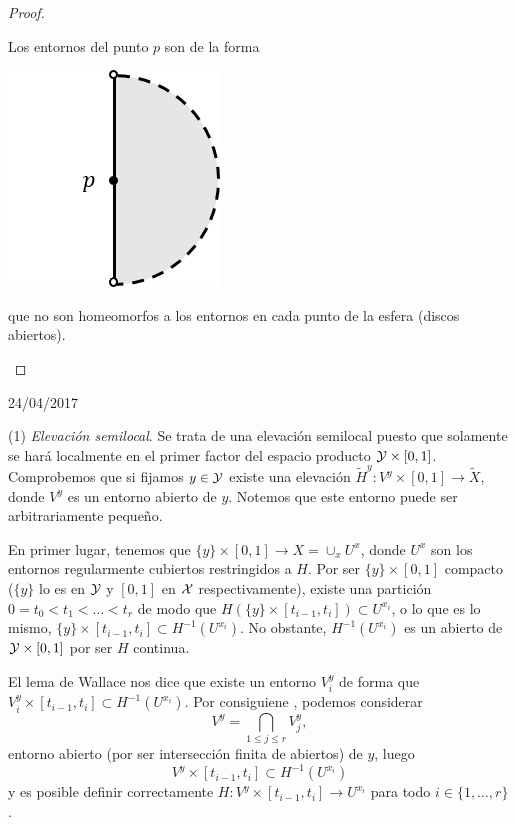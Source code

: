 \begin{itemize}
\begin{proof}
\begin{enumerate}
	Los entornos del punto $p$ son de la forma
	
		\begin{center}
			\includegraphics[scale=0.5]{img/ExamenSeptiembre2017/Ex2007imagen6.png} 
		\end{center}
		
que no son homeomorfos a los entornos en cada punto de la esfera (discos abiertos). 
	\end{enumerate}	
\end{proof}

24/04/2017

(1) \emph{Elevación semilocal}. Se trata de una elevación semilocal puesto que solamente se hará localmente en el primer factor del espacio producto $\mathcal{Y}\times [0,1]$. Comprobemos que si fijamos $y\in \mathcal{Y}$ existe una elevación $\tilde{H}^y: V^y\times [0,1]\to \tilde{X}$, donde $V^y$ es un entorno abierto de $y$. Notemos que este entorno puede ser arbitrariamente pequeño. 

En primer lugar, tenemos que $\{y\}\times [0,1]\to X=\cup_x U^x$, donde $U^x$ son los entornos regularmente cubiertos restringidos a $H$. Por ser $\{y\}\times[0,1]$ compacto ($\{y\}$ lo es en $\mathcal{Y}$ y $[0,1]$ en $\mathcal{X}$ respectivamente), existe una partición $0=t_0<t_1<\ldots <t_r$ de modo que $H(\{y\}\times [t_{i-1},t_i])\subset U^{x_i}$, o lo que es lo mismo, $\{y\}\times [t_{i-1},t_i]\subset H^{-1}(U^{x_i})$. No obstante, $H^{-1}(U^{x_i})$ es un abierto de $\mathcal{Y}\times[0,1]$ por ser $H$ continua. 

El lema de Wallace nos dice que existe un entorno $V^y_i$ de forma que $V_i^y\times [t_{i-1},t_i]\subset H^{-1}(U^{x_i})$. Por consiguiene , podemos considerar
\[V^y=\bigcap_{1\leq j\leq r}V_j^y,\]
entorno abierto  (por ser intersección finita de abiertos) de $y$, luego 
\[V^y\times[t_{i-1},t_i]\subset H^{-1}(U^{x_i})\]
y es posible definir correctamente $H: V^y\times [t_{i-1},t_i]\to U^{x_i}$ para todo $i\in\{1,\ldots, r\}$. 


\end{itemize}
